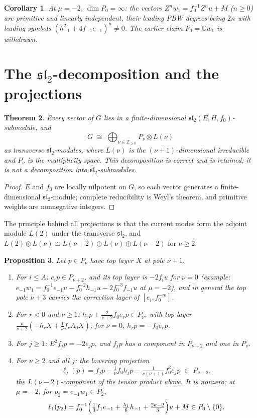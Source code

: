 \documentclass[11pt]{article}
\newcommand{\C}{\mathbb C}
\newcommand{\Z}{\mathbb Z}
\newcommand{\g}{\widehat{\mathfrak{sl}}_2}
\newcommand{\slc}{\mathfrak{sl}_2}
\newtheorem{theorem}{Theorem}
\newtheorem{proposition}[theorem]{Proposition}
\newtheorem{corollary}[theorem]{Corollary}
\begin{document}
\begin{corollary}\label{cor:P0}
At $\mu=-2$, $\dim P_0=\infty$: the vectors
$Z^nw_1=f_0^{-1}Z^nu+M$ ($n\ge0$) are primitive and linearly independent,
their leading PBW degrees being $2n$ with leading symbols
$(h_{-1}^2+4f_{-1}e_{-1})^n\ne0$. The earlier claim $P_0=\C w_1$ is
withdrawn.
\end{corollary}

\section{The \texorpdfstring{$\slc$}{sl2}-decomposition and the projections}

\begin{theorem}\label{thm:sl2}
Every vector of $G$ lies in a finite-dimensional
$\slc(E,H,f_0)$-submodule, and
\[
 G\;\cong\;\bigoplus_{\nu\in\Z_{\ge0}}P_\nu\otimes L(\nu)
\]
as transverse $\slc$-modules, where $L(\nu)$ is the $(\nu+1)$-dimensional
irreducible and $P_\nu$ is the multiplicity space. This decomposition is
correct and is retained; it is not a decomposition into $\g$-submodules.
\end{theorem}

\begin{proof}
$E$ and $f_0$ are locally nilpotent on $G$, so each vector generates a
finite-dimensional $\slc$-module; complete reducibility is Weyl's theorem,
and primitive weights are nonnegative integers.
\end{proof}

The principle behind all projections is that the current modes form the
adjoint module $L(2)$ under the transverse $\slc$, and
$L(2)\otimes L(\nu)\cong L(\nu+2)\oplus L(\nu)\oplus L(\nu-2)$ for
$\nu\ge2$.

\begin{proposition}\label{prop:proj}
Let $p\in P_\nu$ have top layer $X$ at pole $\nu+1$.
\begin{enumerate}
\item[(i)] For $i\le A$: $e_ip\in P_{\nu+2}$, and its top layer is
$-2f_i u$ for $\nu=0$ (example: $e_{-1}w_1=f_0^{-1}e_{-1}u-f_0^{-2}h_{-1}u
-2f_0^{-3}f_{-1}u$ at $\mu=-2$), and in general the top pole $\nu+3$ carries
the correction layer of $[e_i,f_0^{-m}]$.
\item[(ii)] For $r<0$ and $\nu\ge1$:
$h_rp+\tfrac{2}{\nu+2}f_0e_rp\in P_\nu$, with top layer
$\tfrac{\nu}{\nu+2}(-h_rX+\tfrac1\nu f_rA_0X)$; for $\nu=0$,
$h_rp=-f_0e_rp$.
\item[(iii)] For $j\ge1$: $E^2f_jp=-2e_jp$, and $f_jp$ has a component in
$P_{\nu+2}$ and one in $P_\nu$.
\item[(iv)] For $\nu\ge2$ and all $j$: the lowering projection
\begin{equation}\label{eq:lowering}
 \ell_j(p)=f_jp-\tfrac1\nu f_0h_jp
 -\tfrac{1}{\nu(\nu+1)}f_0^2e_jp\;\in\;P_{\nu-2},
\end{equation}
the $L(\nu-2)$-component of the tensor product above. It is nonzero: at
$\mu=-2$, for $p_2=e_{-1}w_1\in P_2$,
\[
 \ell_1(p_2)=f_0^{-1}\Bigl(\tfrac13f_1e_{-1}+\tfrac{\lambda_1}{6}h_{-1}
 +\tfrac{2\kappa-2}{3}\Bigr)u+M\in P_0\setminus\{0\}.
\]
\end{enumerate}
\end{proposition}
\end{document}
